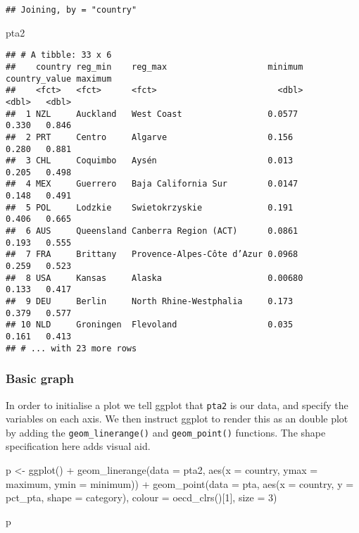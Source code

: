 \documentclass[
]{article}
\newenvironment{Shaded}{\begin{snugshade}}{\end{snugshade}}
\newcommand{\AttributeTok}[1]{\textcolor[rgb]{0.77,0.63,0.00}{#1}}
\newcommand{\DecValTok}[1]{\textcolor[rgb]{0.00,0.00,0.81}{#1}}
\newcommand{\FunctionTok}[1]{\textcolor[rgb]{0.00,0.00,0.00}{#1}}
\newcommand{\NormalTok}[1]{#1}
\newcommand{\OtherTok}[1]{\textcolor[rgb]{0.56,0.35,0.01}{#1}}
\newcommand{\SpecialCharTok}[1]{\textcolor[rgb]{0.00,0.00,0.00}{#1}}
\begin{document}
\begin{verbatim}
## Joining, by = "country"
\end{verbatim}

\begin{Shaded}
\begin{Highlighting}[]
\NormalTok{pta2}
\end{Highlighting}
\end{Shaded}

\begin{verbatim}
## # A tibble: 33 x 6
##    country reg_min    reg_max                    minimum country_value maximum
##    <fct>   <fct>      <fct>                        <dbl>         <dbl>   <dbl>
##  1 NZL     Auckland   West Coast                 0.0577          0.330   0.846
##  2 PRT     Centro     Algarve                    0.156           0.280   0.881
##  3 CHL     Coquimbo   Aysén                      0.013           0.205   0.498
##  4 MEX     Guerrero   Baja California Sur        0.0147          0.148   0.491
##  5 POL     Lodzkie    Swietokrzyskie             0.191           0.406   0.665
##  6 AUS     Queensland Canberra Region (ACT)      0.0861          0.193   0.555
##  7 FRA     Brittany   Provence-Alpes-Côte d’Azur 0.0968          0.259   0.523
##  8 USA     Kansas     Alaska                     0.00680         0.133   0.417
##  9 DEU     Berlin     North Rhine-Westphalia     0.173           0.379   0.577
## 10 NLD     Groningen  Flevoland                  0.035           0.161   0.413
## # ... with 23 more rows
\end{verbatim}

\hypertarget{basic-graph-2}{%
\subsubsection{Basic graph}\label{basic-graph-2}}

In order to initialise a plot we tell ggplot that \texttt{pta2} is our
data, and specify the variables on each axis. We then instruct ggplot to
render this as an double plot by adding the \texttt{geom\_linerange()}
and \texttt{geom\_point()} functions. The shape specification here adds
visual aid.

\begin{Shaded}
\begin{Highlighting}[]
\NormalTok{p }\OtherTok{\textless{}{-}} \FunctionTok{ggplot}\NormalTok{() }\SpecialCharTok{+}
  \FunctionTok{geom\_linerange}\NormalTok{(}\AttributeTok{data =}\NormalTok{ pta2, }\FunctionTok{aes}\NormalTok{(}\AttributeTok{x =}\NormalTok{ country, }\AttributeTok{ymax =}\NormalTok{ maximum, }\AttributeTok{ymin =}\NormalTok{ minimum)) }\SpecialCharTok{+}
  \FunctionTok{geom\_point}\NormalTok{(}\AttributeTok{data =}\NormalTok{ pta, }
             \FunctionTok{aes}\NormalTok{(}\AttributeTok{x =}\NormalTok{ country, }\AttributeTok{y =}\NormalTok{ pct\_pta, }\AttributeTok{shape =}\NormalTok{ category), }
             \AttributeTok{colour =} \FunctionTok{oecd\_clrs}\NormalTok{()[}\DecValTok{1}\NormalTok{], }\AttributeTok{size =} \DecValTok{3}\NormalTok{)}

\NormalTok{p}
\end{Highlighting}
\end{Shaded}
\end{document}

